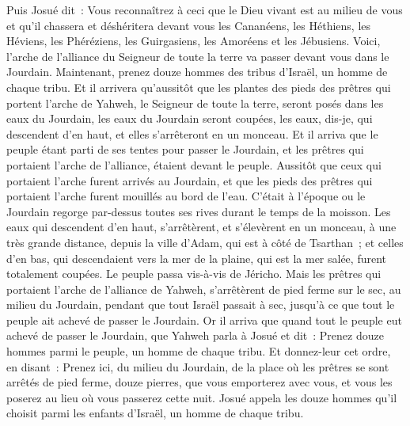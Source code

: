 \begin{multicols}{2}
Puis Josué dit~: Vous reconnaîtrez à ceci que le Dieu vivant est au milieu de vous et qu'il chassera et déshéritera devant vous les Cananéens, les Héthiens, les Héviens, les Phéréziens, les Guirgasiens, les Amoréens et les Jébusiens.
Voici, l'arche de l'alliance du Seigneur de toute la terre va passer devant vous dans le Jourdain.
Maintenant, prenez douze hommes des tribus d'Israël, un homme de chaque tribu.
Et il arrivera qu'aussitôt que les plantes des pieds des prêtres qui portent l'arche de Yahweh, le Seigneur de toute la terre, seront posés dans les eaux du Jourdain, les eaux du Jourdain seront coupées, les eaux, dis-je, qui descendent d'en haut, et elles s'arrêteront en un monceau.
Et il arriva que le peuple étant parti de ses tentes pour passer le Jourdain, et les prêtres qui portaient l'arche de l'alliance, étaient devant le peuple.
Aussitôt que ceux qui portaient l'arche furent arrivés au Jourdain, et que les pieds des prêtres qui portaient l'arche furent mouillés au bord de l'eau. C'était à l'époque ou le Jourdain regorge par-dessus toutes ses rives durant le temps de la moisson.
Les eaux qui descendent d'en haut, s'arrêtèrent, et s'élevèrent en un monceau, à une très grande distance, depuis la ville d'Adam, qui est à côté de Tsarthan~; et celles d'en bas, qui descendaient vers la mer de la plaine, qui est la mer salée, furent totalement coupées. Le peuple passa vis-à-vis de Jéricho.
Mais les prêtres qui portaient l'arche de l'alliance de Yahweh, s'arrêtèrent de pied ferme sur le sec, au milieu du Jourdain, pendant que tout Israël passait à sec, jusqu'à ce que tout le peuple ait achevé de passer le Jourdain.
\VerseOne{}Or il arriva que quand tout le peuple eut achevé de passer le Jourdain, que Yahweh parla à Josué et dit~:
Prenez douze hommes parmi le peuple, un homme de chaque tribu.
Et donnez-leur cet ordre, en disant~: Prenez ici, du milieu du Jourdain, de la place où les prêtres se sont arrêtés de pied ferme, douze pierres, que vous emporterez avec vous, et vous les poserez au lieu où vous passerez cette nuit.
Josué appela les douze hommes qu'il choisit parmi les enfants d'Israël, un homme de chaque tribu.

\end{multicols}

